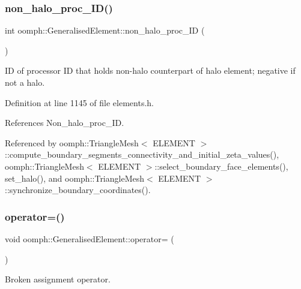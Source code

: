 \subsubsection{\texorpdfstring{non\+\_\+halo\+\_\+proc\+\_\+\+I\+D()}{non\_halo\_proc\_ID()}}
{\footnotesize\ttfamily int oomph\+::\+Generalised\+Element\+::non\+\_\+halo\+\_\+proc\+\_\+\+ID (\begin{DoxyParamCaption}{ }\end{DoxyParamCaption})\hspace{0.3cm}{\ttfamily [inline]}}



ID of processor ID that holds non-\/halo counterpart of halo element; negative if not a halo. 



Definition at line 1145 of file elements.\+h.



References Non\+\_\+halo\+\_\+proc\+\_\+\+ID.



Referenced by oomph\+::\+Triangle\+Mesh$<$ E\+L\+E\+M\+E\+N\+T $>$\+::compute\+\_\+boundary\+\_\+segments\+\_\+connectivity\+\_\+and\+\_\+initial\+\_\+zeta\+\_\+values(), oomph\+::\+Triangle\+Mesh$<$ E\+L\+E\+M\+E\+N\+T $>$\+::select\+\_\+boundary\+\_\+face\+\_\+elements(), set\+\_\+halo(), and oomph\+::\+Triangle\+Mesh$<$ E\+L\+E\+M\+E\+N\+T $>$\+::synchronize\+\_\+boundary\+\_\+coordinates().

\mbox{\label{classoomph_1_1GeneralisedElement_a180a0684a2b174f0396b97f247eb629f}} 
\subsubsection{\texorpdfstring{operator=()}{operator=()}}
{\footnotesize\ttfamily void oomph\+::\+Generalised\+Element\+::operator= (\begin{DoxyParamCaption}\item[{const \hyperlink{classoomph_1_1GeneralisedElement}{Generalised\+Element} \&}]{ }\end{DoxyParamCaption})\hspace{0.3cm}{\ttfamily [inline]}}



Broken assignment operator. 



